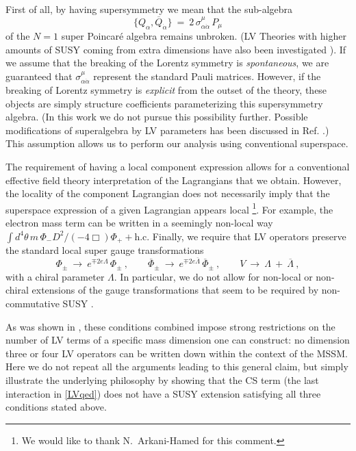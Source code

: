 \documentclass[12pt]{revtex4}
\begin{document}
First of all,
by having supersymmetry we mean that the sub-algebra 
%
\begin{equation}
\{ Q_\alpha, \overline{Q}_{\dot\alpha} \} ~=~ 
2\, \sigma^\mu_{\alpha\dot{\alpha}} \, P_\mu
\end{equation}
%
of the $N=1$ super Poincar\'e algebra remains unbroken. (LV Theories with
higher amounts of SUSY coming from extra dimensions have also
been investigated  \cite{Ney:2004tn,Ney:2005gb,Ney:2005wc}).
If we assume that the breaking of the Lorentz symmetry is 
{\em spontaneous}, we are guaranteed that
$\sigma^\mu_{\alpha\dot{\alpha}}$ represent the standard Pauli
matrices. However, if the breaking of Lorentz symmetry is {\em
explicit} from the outset of the theory, these objects are simply 
structure coefficients parameterizing this supersymmetry algebra. (In
this work we do not pursue this possibility further. Possible
modifications of superalgebra by LV parameters has been discussed in
Ref. \cite{Berger:,Berger:2003ay}.) This assumption allows us to perform our
analysis using conventional superspace.  


The requirement of having a local component expression allows for a
conventional effective field theory interpretation of the Lagrangians that
we obtain. However, the locality of the component Lagrangian
does not necessarily imply that the superspace
expression of a given Lagrangian appears local 
\footnote{We would like to thank N.\ Arkani-Hamed for this comment.}. 
For example, the electron mass term can be written in a seemingly
non-local way 
%
\(
\int d^4 \theta\, m \, \Phi_- D^2/(- 4\Box) \Phi_+ + \text{h.c.}
\)
%
Finally, we require that LV operators preserve the standard local
super gauge transformations  
%
\begin{equation}
\Phi_\pm ~\rightarrow~ e^{\mp 2 e \Lambda} \, \Phi_\pm~, 
\qquad 
\overline{\Phi}_\pm ~\rightarrow~ e^{\mp 2 e \overline{\Lambda}} \, 
\overline{\Phi}_\pm~, 
\qquad 
V ~\rightarrow~ \Lambda ~+~ \overline{\Lambda}~, 
\label{Gauge}
\end{equation} 
%
with a chiral parameter $\Lambda$. In particular, we do not allow for
non-local or non-chiral extensions of the gauge transformations that
seem to be required by non-commutative SUSY
\cite{Putz:2002ib,Mikulovic:2003sq}.  


As was shown in \cite{GrootNibbelink:2004za}, these conditions 
combined impose strong restrictions on the number of LV terms of
a specific mass dimension one can construct: no dimension three or four
LV operators can be written down within the context of the MSSM. 
Here we do not repeat all the arguments leading to this general claim,
but simply illustrate the underlying philosophy by showing that the CS
term (the last interaction in \eqref{LVqed}) does not have a SUSY
extension satisfying all three conditions stated above. 
\end{document}

